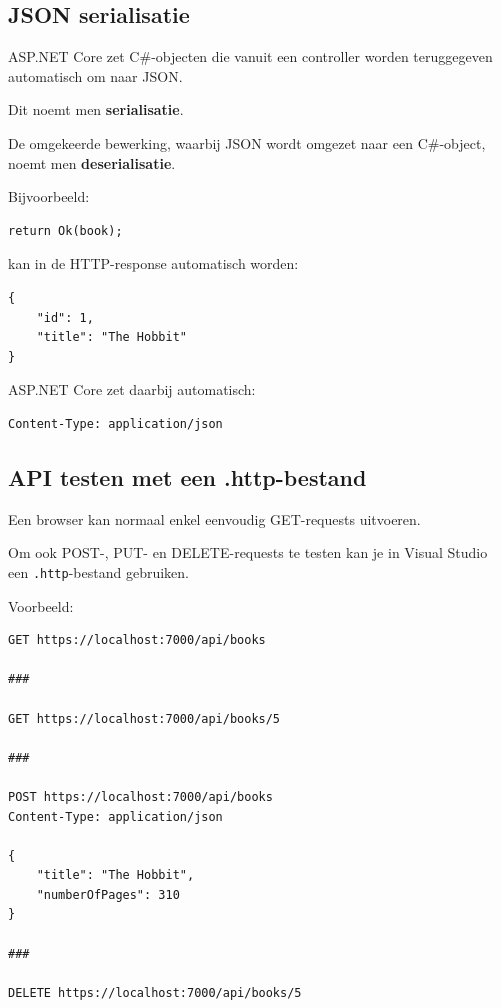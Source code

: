 \subsection{JSON serialisatie}

ASP.NET Core zet C\#-objecten die vanuit een controller worden teruggegeven
automatisch om naar JSON.

Dit noemt men \textbf{serialisatie}.

De omgekeerde bewerking, waarbij JSON wordt omgezet naar een C\#-object,
noemt men \textbf{deserialisatie}.

Bijvoorbeeld:

\begin{verbatim}
return Ok(book);
\end{verbatim}

kan in de HTTP-response automatisch worden:

\begin{verbatim}
{
    "id": 1,
    "title": "The Hobbit"
}
\end{verbatim}

ASP.NET Core zet daarbij automatisch:

\begin{verbatim}
Content-Type: application/json
\end{verbatim}

\subsection{API testen met een .http-bestand}

Een browser kan normaal enkel eenvoudig GET-requests uitvoeren.

Om ook POST-, PUT- en DELETE-requests te testen kan je in Visual Studio
een \texttt{.http}-bestand gebruiken.

Voorbeeld:

\begin{verbatim}
GET https://localhost:7000/api/books

###

GET https://localhost:7000/api/books/5

###

POST https://localhost:7000/api/books
Content-Type: application/json

{
    "title": "The Hobbit",
    "numberOfPages": 310
}

###

DELETE https://localhost:7000/api/books/5
\end{verbatim}


